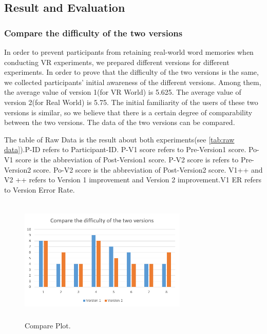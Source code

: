 \documentclass{vgtc}                          %
\begin{document}
\subsection{Result and Evaluation}
\subsubsection{Compare the difficulty of the two versions}
In order to prevent participants from retaining real-world word memories when conducting VR experiments, we prepared different versions for different experiments. In order to prove that the difficulty of the two versions is the same, we collected participants' initial awareness of the different versions. Among them, the average value of version 1(for VR World) is 5.625. The average value of version 2(for Real World) is 5.75. The initial familiarity of the users of these two versions is similar, so we believe that there is a certain degree of comparability between the two versions. The data of the two versions can be compared.

The table of Raw Data is the result about both experiments(see \autoref{tab:raw data}).P-ID refers to Participant-ID. P-V1 score refers to Pre-Version1 score. Po-V1 score is the abbreviation of Post-Version1 score. P-V2 score is refers to Pre-Version2 score. Po-V2 score is the abbreviation of Post-Version2 score. V1++ and V2 ++ refers to Version 1 improvement and Version 2 improvement.V1 ER refers to  Version Error Rate. 
\begin{figure}[H]
 \centering
 \includegraphics[width=8cm, height=6cm]{pictures/Compare.png}
 \caption{Compare Plot.}
 \label{fig:compare}
\end{figure}
\end{document}
